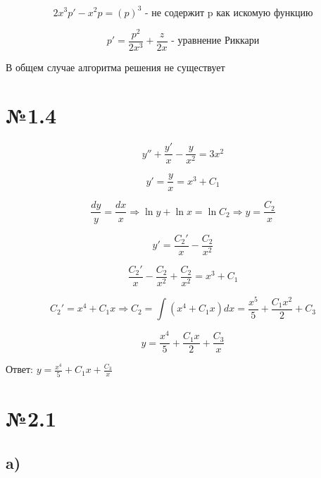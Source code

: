\documentclass{article}
\begin{document}
\begin{equation*}
    2x^3p' - x^2p = (p)^3 \text{ - не содержит p как искомую функцию}
\end{equation*}

\begin{equation*}
    p' = \frac{p^2}{2x^3} + \frac{z}{2x} \text{ - уравнение Риккари}
\end{equation*}

В общем случае алгоритма решения не существует

\section*{№1.4}

\begin{equation*}
    y'' + \frac{y'}{x} - \frac{y}{x^2} = 3x^2
\end{equation*}

\begin{equation*}
    y' = \frac{y}{x} = x^3 + C_1
\end{equation*}

\begin{equation*}
    \frac{dy}{y} = \frac{dx}{x} \Rightarrow \ln{y} + \ln{x} = \ln{C_2} \Rightarrow y = \frac{C_2}{x}
\end{equation*}

\begin{equation*}
    y' = \frac{C_2'}{x} - \frac{C_2}{x^2}
\end{equation*}

\begin{equation*}
    \frac{C_2'}{x} - \frac{C_2}{x^2} + \frac{C_2}{x^2} = x^3 + C_1
\end{equation*}

\begin{equation*}
    C_2' = x^4 + C_1x \Rightarrow  C_2 = \int{(x^4 + C_1x)dx} = \frac{x^5}{5} + \frac{C_1x^2}{2} + C_3
\end{equation*}

\begin{equation*}
    y = \frac{x^4}{5} + \frac{C_1x}{2} + \frac{C_3}{x}
\end{equation*}

Ответ: $
y = \frac{x^4}{5} + C_1x + \frac{C_3}{x}
$
\section*{№2.1}
\subsection*{a)}
\end{document}

